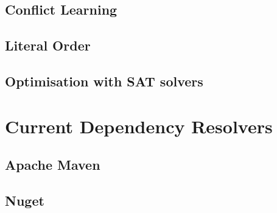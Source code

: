 \subsection{Conflict Learning}



\subsection{Literal Order}


\subsection{Optimisation with SAT solvers}




\section{Current Dependency Resolvers}

\subsection{Apache Maven}

\subsection{Nuget} 

